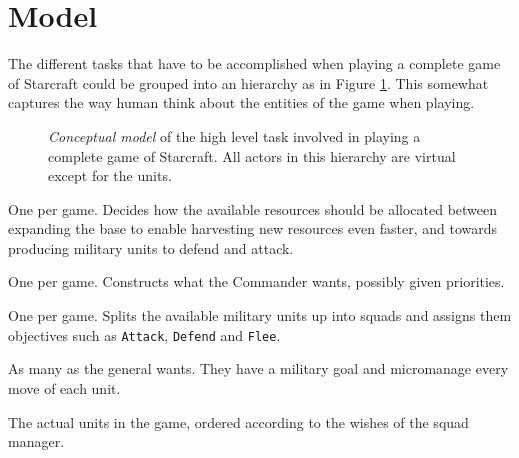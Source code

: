 \section{Model}
The different tasks that have to be accomplished when playing a complete game of Starcraft could be grouped into an hierarchy as in Figure \ref{conceptualModel}. This somewhat captures the way human think about the entities of the game when playing.

\begin{figure}[h!t]
\centering
{}
\caption{
\emph{Conceptual model} of the high level task involved in playing a complete game of Starcraft. All actors in this hierarchy are virtual except for the units.
}
\label{conceptualModel}
\end{figure}

\begin{definition}[Commander]
One per game. Decides how the available resources should be allocated between expanding the base to enable harvesting new resources even faster, and towards producing military units to defend and attack.
\end{definition}
\begin{definition}
One per game. Constructs what the Commander wants, possibly given priorities.
\end{definition}
\textbf{}\begin{definition}[General]
One per game. Splits the available military units up into squads and assigns them objectives such as \texttt{Attack}, \texttt{Defend} and \texttt{Flee}.
\end{definition}
\begin{definition}[Squad]
As many as the general wants. They have a military goal and micromanage every move of each unit.
\end{definition}
\begin{definition}[Unit]
The actual units in the game, ordered according to the wishes of the squad manager.
\end{definition}
